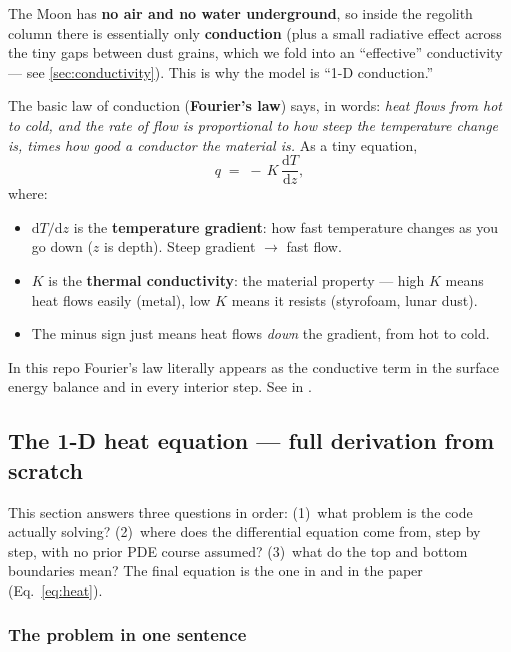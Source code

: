 The Moon has \textbf{no air and no water underground}, so inside the regolith
column there is essentially only \textbf{conduction} (plus a small radiative
effect across the tiny gaps between dust grains, which we fold into an
``effective'' conductivity --- see \autoref{sec:conductivity}). This is why the
model is ``1-D conduction.''

The basic law of conduction (\textbf{Fourier's law}) says, in words: \emph{heat
flows from hot to cold, and the rate of flow is proportional to how steep the
temperature change is, times how good a conductor the material is.} As a tiny
equation,
\begin{equation}
  q \;=\; -\,K\,\frac{\mathrm{d}T}{\mathrm{d}z},
  \label{eq:fourier}
\end{equation}
where:
\begin{itemize}[leftmargin=1.4em,itemsep=3pt]
  \item $\mathrm{d}T/\mathrm{d}z$ is the \textbf{temperature gradient}: how fast
    temperature changes as you go down ($z$ is depth). Steep gradient $\to$ fast
    flow.
  \item $K$ is the \textbf{thermal conductivity}: the material property --- high
    $K$ means heat flows easily (metal), low $K$ means it resists (styrofoam,
    lunar dust).
  \item The minus sign just means heat flows \emph{down} the gradient, from hot
    to cold.
\end{itemize}
In this repo Fourier's law literally appears as the conductive term in the
surface energy balance and in every interior step. See
 in .

\subsection{The 1-D heat equation --- full derivation from scratch}
\label{sec:heateq}

This section answers three questions in order: (1)~what problem is the code
actually solving? (2)~where does the differential equation come from, step by
step, with no prior PDE course assumed? (3)~what do the top and bottom
boundaries mean? The final equation is the one in  and
in the paper (Eq.~\eqref{eq:heat}).

\subsubsection{The problem in one sentence}

